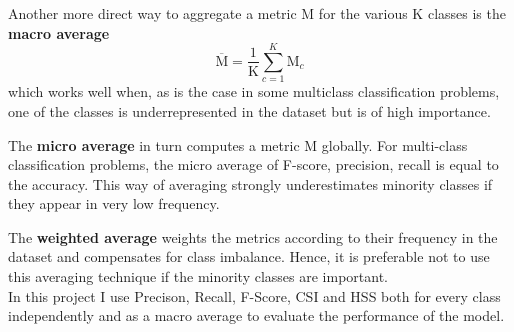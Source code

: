 Another more direct way to aggregate a metric M for the various K classes is the \textbf{macro average}
\begin{equation}
    \overline{\text{M}} = \frac{1}{\text{K}} \sum_{c=1}^K \text{M}_c
\end{equation}
which works well when, as is the case in some multiclass classification problems, one of the classes is underrepresented in the dataset but is of high importance.

The \textbf{micro average} in turn computes a metric M globally. For multi-class classification problems, the micro average of F-score, precision, recall is equal to the accuracy. This way of averaging strongly underestimates minority classes if they appear in very low frequency.

The \textbf{weighted average} weights the metrics according to their frequency in the dataset and compensates for class imbalance. Hence, it is preferable not to use this averaging technique if the minority classes are important.
\\

In this project I use Precison, Recall, F-Score, CSI and HSS both for every class independently and as a macro average to evaluate the performance of the model.

